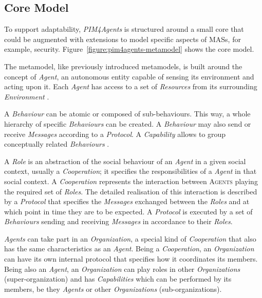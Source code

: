 \subsection*{Core Model}

To support adaptability, \textit{PIM4Agents} is structured around a small core that could be augmented with extensions to model specific aspects of MASs, for example, security.
Figure~\ref{figure:pim4agents-metamodel} shows the core model.

The metamodel, like previously introduced metamodels, is built around the concept of \textit{Agent}, an autonomous entity capable of sensing its environment and acting upon it.
Each \textit{Agent} has access to a set of \textit{Resources} from its surrounding \textit{Environment} \cite{Hahn07b}.

A \textit{Behaviour} can be atomic or composed of sub-behaviours.
This way, a whole hierarchy of specific \textit{Behaviours} can be created.
A \textit{Behaviour} may also send or receive \textit{Messages} according to a \textit{Protocol}.
A \textit{Capability} allows to group conceptually related \textit{Behaviours} \cite{Hahn07b}.

A \textit{Role} is an abstraction of the social behaviour of an \textit{Agent} in a given social context, usually a \textit{Cooperation}; it specifies the responsibilities of a \textit{Agent} in that social context.
A \textit{Cooperation} represents the interaction between \textsc{Agents} playing the required set of \textit{Roles}.
The detailed realisation of this interaction is described by a \textit{Protocol} that specifies the \textit{Messages} exchanged between the \textit{Roles} and at which point in time they are to be expected.
A \textit{Protocol} is executed by a set of \textit{Behaviours} sending and receiving \textit{Messages} in accordance to their \textit{Roles}.

\textit{Agents} can take part in an \textit{Organization}, a special kind of \textit{Cooperation} that also has the same characteristics as an \textit{Agent}.
Being a \textit{Cooperation}, an \textit{Organization} can have its own internal protocol that specifies how it coordinates its members.
Being also an \textit{Agent}, an \textit{Organization} can play roles in other \textit{Organizations} (super-organization) and has \textit{Capabilities} which can be performed by its members, be they \textit{Agents} or other \textit{Organizations} (sub-organizations).

